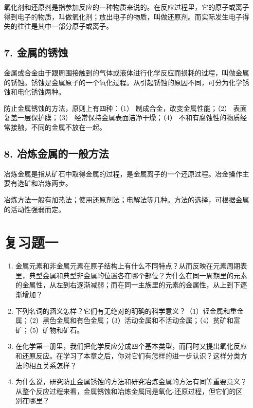 氧化剂和还原剂是指参加反应的一种物质来说的。在反应过程里，它的原子或离子得到电子的物质，叫做氧化剂；放出电子的物质，叫做还原剂。而实际发生电子得失的往往是其中一部分原子或离子。

\subsection{7. 金属的锈蚀}

金属或合金由于跟周围接触到的气体或液体进行化学反应而损耗的过程，叫做金属的锈蚀。锈蚀是金属原子的一个氧化过程。从引起锈蚀的原因不同，可分为化学锈蚀和电化锈蚀两种。

防止金属锈蚀的方法，原则上有四种：（1） 制成合金，改变金属性能；（2）
表面复盖一层保护膜；（3） 经常保持金属表面洁净干燥；（4）
不和有腐蚀性的物质经常接触，不同的金属不放在一起。

\subsection{8. 冶炼金属的一般方法}

冶炼金属是指从矿石中取得金属的过程，是金属离子的一个还原过程。冶金操作主要有选矿和冶炼两步。

冶炼方法一般有加热法；使用还原剂法；电解法等几种。方法的选择，可根据金属的活动性强弱而定。

\section{复习题一}

\begin{enumerate}
\item
  金属元素和非金属元素在原子结构上有什么不同特点？从而反映在元素周期表里，典型金属和典型非金属的位置各在哪个部位？为什么在同一周期里的元素的金属性，从左到右逐渐减弱；而在同一主族里的元素的金属性，从上到下逐渐增加？
\item
  下列名词的涵义怎样？它们有无绝对的明确的科学意义？（1）轻金属和重金属；（2）黑色金属和有色金属；（3）活动金属和不活动金属；（4）贫矿和富矿；（5）矿物和矿石。
\item
  在化学第一册里，我们把化学反应分成四个基本类型，而同时又提出氧化反应和还原反应。在学习了本章之后，你对它们有怎样的进一步认识？这样分类方法的相互关系怎样？
\item
  为什么说，研究防止金属锈蚀的方法和研究冶炼金属的方法有同等重要意义？从整个反应过程来看，金属锈蚀和冶炼金属同是氧化-还原过程，但它们的区别在哪里？
\end{enumerate}


